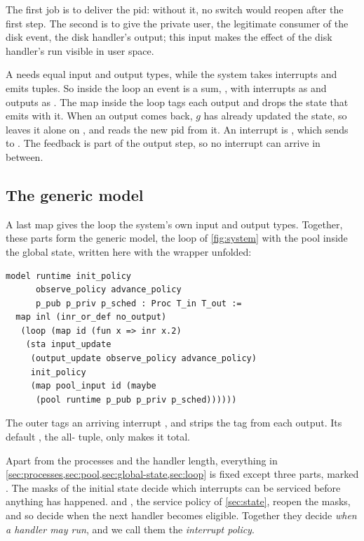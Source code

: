 The first job is to deliver the pid: without it, no switch would reopen after
the first step. The second is to give the private user, the legitimate consumer of
the disk event, the disk handler's output; this input makes the effect of the disk
handler's run visible in user space.

A  needs equal input and output types, while the system takes
interrupts and emits tuples. So inside the loop an event is a sum, ,
with interrupts as  and outputs as . The map inside the loop tags
each output  and drops the state that  emits with it. When an
output comes back, $g$ has already updated the state, so  leaves it
alone on , and  reads the new pid from it. An interrupt
is , which  sends to . The feedback is part of the
output step, so no interrupt can arrive in between.

\subsection{The generic model}\label{sec:parameters}

A last map gives the loop the system's own input and output types. Together, these
parts form the generic model, the loop of \cref{fig:system} with the pool inside the
global state, written here with the wrapper  unfolded:

\noindent\begin{minipage}{\linewidth}
\begin{lstlisting}
model runtime init_policy
      observe_policy advance_policy
      p_pub p_priv p_sched : Proc T_in T_out :=
  map inl (inr_or_def no_output)
   (loop (map id (fun x => inr x.2)
    (sta input_update
     (output_update observe_policy advance_policy)
     init_policy
     (map pool_input id (maybe
      (pool runtime p_pub p_priv p_sched))))))
\end{lstlisting}
\end{minipage}
The outer  tags an arriving interrupt , and 
strips the  tag from each output. Its
default , the all- tuple, only makes it total.

Apart from the processes and the handler length, everything in
\cref{sec:processes,sec:pool,sec:global-state,sec:loop} is fixed except three parts,
marked . The masks of the initial state 
decide which interrupts can be serviced before anything has happened.
 and , the service policy of
\cref{sec:state}, reopen the masks, and so decide when the next handler becomes
eligible. Together they decide \emph{when a handler may run}, and we call them the
\emph{interrupt policy}.


